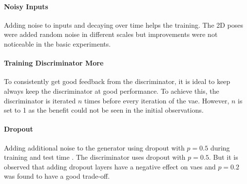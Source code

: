 \paragraph{Noisy Inputs}
Adding noise to inputs and decaying over time helps the training. The 2D poses were added random noise in different scales but improvements were not noticeable in the basic experiments. 

\paragraph{Training Discriminator More}
To consistently get good feedback from the discriminator, it is ideal to keep always keep the discriminator at good performance. To achieve this, the discriminator is iterated $n$ times before every iteration of the \ac{vae}. However, $n$ is set to 1 as the benefit could not be seen in the initial observations.

\paragraph{Dropout}
Adding additional noise to the generator using dropout with $p=0.5$ during training and test time \cite{gan_dropout}. The discriminator uses dropout with $p=0.5$. But it is observed that adding dropout layers have a negative effect on \acp{vae} and $p=0.2$ was found to have a good trade-off. 




